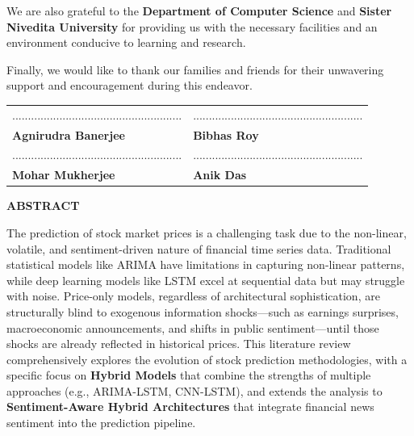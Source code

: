 \documentclass[12pt,a4paper]{article}
\begin{document}
\vspace{0.5cm}
\noindent We are also grateful to the \textbf{Department of Computer Science} and \textbf{Sister Nivedita University} for providing us with the necessary facilities and an environment conducive to learning and research.

\vspace{0.5cm}
\noindent Finally, we would like to thank our families and friends for their unwavering support and encouragement during this endeavor.

\vspace{2cm}
\vspace{2cm}
\begin{table}[h]
    \centering
    \begin{tabular}{p{6cm} p{6cm}}
        ...................................................... & ...................................................... \\
        \textbf{Agnirudra Banerjee} & \textbf{Bibhas Roy} \\[1cm]
        
        ...................................................... & ...................................................... \\
        \textbf{Mohar Mukherjee} & \textbf{Anik Das} \\
    \end{tabular}
\end{table}

\newpage

\begin{center}
    \vspace*{1cm}
    {\Large \bfseries \color{titlecolor} ABSTRACT}
    \vspace{1cm}
\end{center}

\noindent The prediction of stock market prices is a challenging task due to the non-linear, volatile, and sentiment-driven nature of financial time series data. Traditional statistical models like ARIMA have limitations in capturing non-linear patterns, while deep learning models like LSTM excel at sequential data but may struggle with noise. Price-only models, regardless of architectural sophistication, are structurally blind to exogenous information shocks---such as earnings surprises, macroeconomic announcements, and shifts in public sentiment---until those shocks are already reflected in historical prices. This literature review comprehensively explores the evolution of stock prediction methodologies, with a specific focus on \textbf{Hybrid Models} that combine the strengths of multiple approaches (e.g., ARIMA-LSTM, CNN-LSTM), and extends the analysis to \textbf{Sentiment-Aware Hybrid Architectures} that integrate financial news sentiment into the prediction pipeline.
\end{document}
